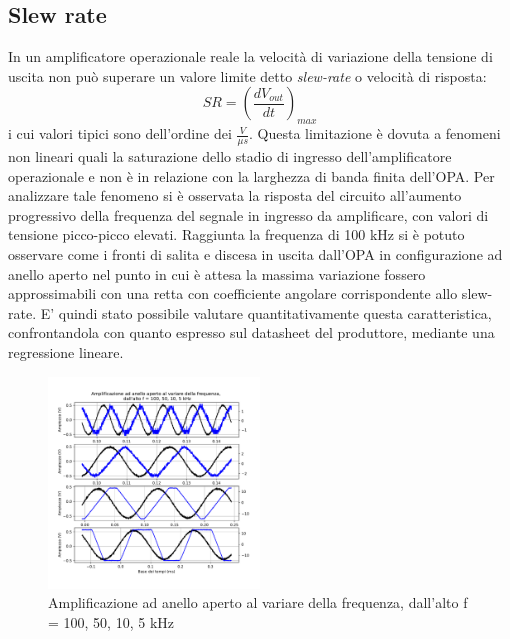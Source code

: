 \documentclass[journal]{IEEEtran}
\begin{document}
\subsection{Slew rate}
In un amplificatore operazionale reale la velocità di variazione della tensione di uscita non può superare un valore limite detto \textit{slew-rate} o velocità di risposta:
\begin{equation}
    SR = (\frac{dV_{out}}{dt})_{max}
\end{equation}
i cui valori tipici sono dell'ordine dei $\frac{V}{\mu s}$.
Questa limitazione è dovuta a fenomeni non lineari quali la saturazione dello stadio di ingresso dell'amplificatore operazionale e non è in relazione con la larghezza di banda finita dell'OPA. 
Per analizzare tale fenomeno si è osservata la risposta del circuito all'aumento progressivo della frequenza del segnale in ingresso da amplificare, con valori di tensione picco-picco elevati. Raggiunta la frequenza di 100 kHz si è potuto osservare come i fronti di salita e discesa in uscita dall'OPA in configurazione ad anello aperto nel punto in cui è attesa la massima variazione fossero approssimabili con una retta con coefficiente angolare corrispondente allo slew-rate. E' quindi stato possibile valutare quantitativamente questa caratteristica, confrontandola con quanto espresso sul datasheet del produttore, mediante una regressione lineare.
\begin{figure}[H]%
\begin {center}
\includegraphics[width=0.50\textwidth]{analysis/output/OPA-open-loop-slew-rate.pdf}
\caption{Amplificazione ad anello aperto al variare della frequenza,  dall'alto f = 100, 50, 10, 5 kHz}
\label{fig:slew-rate-table}
\end {center}
\end{figure}
\end{document}
